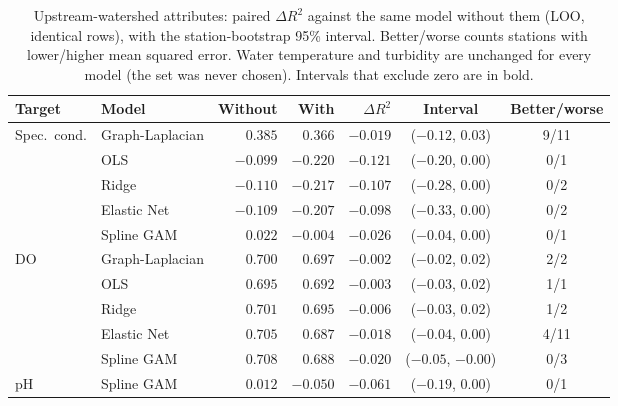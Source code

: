 \documentclass[11pt]{article}
\begin{document}
\begin{table}[h]
\centering
\small
\caption{Upstream-watershed attributes: paired $\Delta R^2$ against the same model without them
(LOO, identical rows), with the station-bootstrap 95\% interval. Better/worse counts stations with
lower/higher mean squared error. Water temperature and turbidity are unchanged for every model
(the set was never chosen). Intervals that exclude zero are in bold.}
\label{tab:upstream}
\begin{tabular}{ll rrrcc}
\toprule
Target & Model & Without & With & $\Delta R^2$ & Interval & Better/worse \\
\midrule
Spec.\ cond.  & Graph-Laplacian & $0.385$ & $0.366$ & $-0.019$ & ($-0.12$, $0.03$) & 9/11 \\
              & OLS             & $-0.099$ & $-0.220$ & $-0.121$ & ($-0.20$, $0.00$) & 0/1 \\
              & Ridge           & $-0.110$ & $-0.217$ & $-0.107$ & ($-0.28$, $0.00$) & 0/2 \\
              & Elastic Net     & $-0.109$ & $-0.207$ & $-0.098$ & ($-0.33$, $0.00$) & 0/2 \\
              & Spline GAM      & $0.022$ & $-0.004$ & $-0.026$ & ($-0.04$, $0.00$) & 0/1 \\
\addlinespace
DO            & Graph-Laplacian & $0.700$ & $0.697$ & $-0.002$ & ($-0.02$, $0.02$) & 2/2 \\
              & OLS             & $0.695$ & $0.692$ & $-0.003$ & ($-0.03$, $0.02$) & 1/1 \\
              & Ridge           & $0.701$ & $0.695$ & $-0.006$ & ($-0.03$, $0.02$) & 1/2 \\
              & Elastic Net     & $0.705$ & $0.687$ & $-0.018$ & ($-0.04$, $0.00$) & 4/11 \\
              & Spline GAM      & $0.708$ & $0.688$ & $\mathbf{-0.020}$ & ($-0.05$, $-0.00$) & 0/3 \\
\addlinespace
pH            & Spline GAM      & $0.012$ & $-0.050$ & $-0.061$ & ($-0.19$, $0.00$) & 0/1 \\
\bottomrule
\end{tabular}
\end{table}
\end{document}

